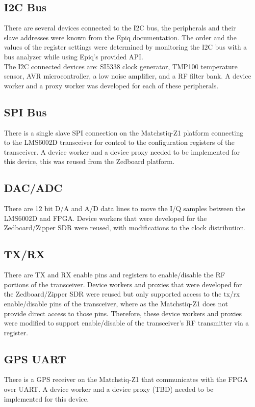   \subsection{I2C Bus}
  There are several devices connected to the I2C bus, the peripherals and their slave addresses were known from the Epiq documentation.  The order and the values of the register settings were determined by monitoring the I2C bus with a bus analyzer while using Epiq's provided API.\\

\noindent The I2C connected devices are: SI5338 clock generator, TMP100 temperature sensor, AVR microcontroller, a low noise amplifier, and a RF filter bank.  A device worker and a  proxy worker was developed for each of these peripherals.

  \subsection{SPI Bus}
    There is a single slave SPI connection on the Matchstiq-Z1 platform connecting to the LMS6002D transceiver for control to the configuration registers of the transceiver.  A device worker and a device proxy needed to be implemented for this device, this was reused from the Zedboard platform.

  \subsection{DAC/ADC}
    There are 12 bit D/A and A/D data lines to move the I/Q samples between the LMS6002D and FPGA.  Device workers that were developed for the Zedboard/Zipper SDR were reused, with modifications to the clock distribution.

  \subsection{TX/RX}
    There are TX and RX enable pins and registers to enable/disable the RF portions of the transceiver.  Device workers and proxies that were developed for the Zedboard/Zipper SDR were reused but only supported access to the tx/rx enable/disable pins of the transceiver, where as the Matchstiq-Z1 does not provide direct access to those pins. Therefore, these device workers and proxies were modified to support enable/disable of the transceiver's RF transmitter via a register.

  \subsection{GPS UART}
    There is a GPS receiver on the Matchstiq-Z1 that communicates with the FPGA over UART.  A device worker and a device proxy (TBD) needed to be implemented for this device.

